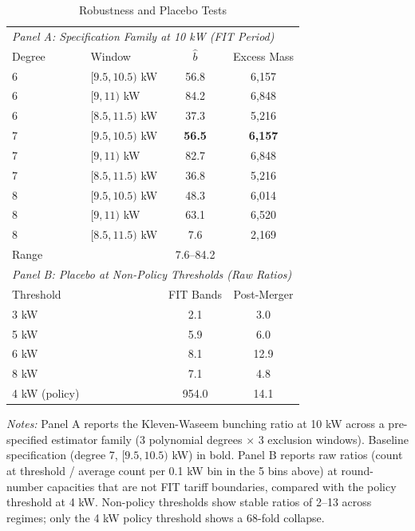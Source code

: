\begin{table}[t]
\centering
\caption{Robustness and Placebo Tests}
\label{tab:robustness}
\begin{tabular}{llcc}
\toprule
\multicolumn{4}{l}{\textit{Panel A: Specification Family at 10 kW (FIT Period)}} \\
Degree & Window & $\hat{b}$ & Excess Mass \\
\midrule
  6 & $[9.5, 10.5)$ kW & 56.8 & 6,157 \\
  6 & $[9, 11)$ kW & 84.2 & 6,848 \\
  6 & $[8.5, 11.5)$ kW & 37.3 & 5,216 \\
  7 & $[9.5, 10.5)$ kW & \textbf{56.5} & \textbf{6,157} \\
  7 & $[9, 11)$ kW & 82.7 & 6,848 \\
  7 & $[8.5, 11.5)$ kW & 36.8 & 5,216 \\
  8 & $[9.5, 10.5)$ kW & 48.3 & 6,014 \\
  8 & $[9, 11)$ kW & 63.1 & 6,520 \\
  8 & $[8.5, 11.5)$ kW & 7.6 & 2,169 \\
\midrule
\multicolumn{2}{l}{Range} & 7.6--84.2 & \\
\midrule
\multicolumn{4}{l}{\textit{Panel B: Placebo at Non-Policy Thresholds (Raw Ratios)}} \\
Threshold & & FIT Bands & Post-Merger \\
\midrule
  3 kW & & 2.1 & 3.0 \\
  5 kW & & 5.9 & 6.0 \\
  6 kW & & 8.1 & 12.9 \\
  8 kW & & 7.1 & 4.8 \\
\midrule
4 kW (policy) & & 954.0 & 14.1 \\
\bottomrule
\end{tabular}

\begin{flushleft}\small \textit{Notes:} Panel A reports the Kleven-Waseem bunching ratio at 10 kW across a pre-specified estimator family (3 polynomial degrees $\times$ 3 exclusion windows). Baseline specification (degree 7, $[9.5, 10.5)$ kW) in bold. Panel B reports raw ratios (count at threshold / average count per 0.1 kW bin in the 5 bins above) at round-number capacities that are not FIT tariff boundaries, compared with the policy threshold at 4 kW. Non-policy thresholds show stable ratios of 2--13 across regimes; only the 4 kW policy threshold shows a 68-fold collapse.\end{flushleft}
\end{table}
